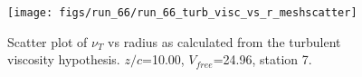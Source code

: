 \begin{figure}[H]
\centering
\texttt{[image: figs/run\_66/run\_66\_turb\_visc\_vs\_r\_meshscatter]}
\caption{Scatter plot of $\nu_T$ vs radius as calculated from the turbulent viscosity hypothesis. $z/c$=10.00, $V_{free}$=24.96, station 7.}
\label{fig:run_66_turb_visc_vs_r_meshscatter}
\end{figure}


